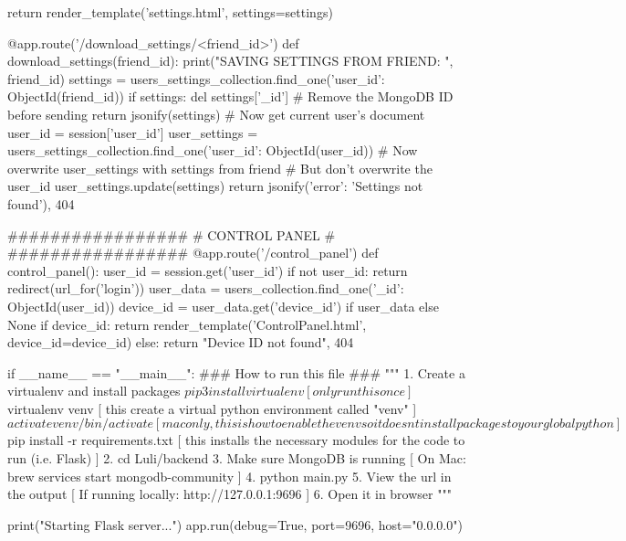 \documentclass[12pt]{article} %
\begin{document}
\begin{pythoncode}[caption={Main Flask Backend Code}]
        return render_template('settings.html', settings=settings)
    
    @app.route('/download_settings/<friend_id>')
    def download_settings(friend_id):
        print("SAVING SETTINGS FROM FRIEND: ", friend_id)
        settings = users_settings_collection.find_one({'user_id': ObjectId(friend_id)})
        if settings:
            del settings['_id']  # Remove the MongoDB ID before sending
            return jsonify(settings)
        # Now get current user's document
        user_id = session['user_id']
        user_settings = users_settings_collection.find_one({'user_id': ObjectId(user_id)})
        # Now overwrite user_settings with settings from friend
        # But don't overwrite the user_id
        user_settings.update(settings)
        return jsonify({'error': 'Settings not found'}), 404
    
    
    #################
    # CONTROL PANEL #
    #################
    @app.route('/control_panel')
    def control_panel():
        user_id = session.get('user_id')
        if not user_id:
            return redirect(url_for('login'))
        user_data = users_collection.find_one({'_id': ObjectId(user_id)})
        device_id = user_data.get('device_id') if user_data else None
        if device_id:
            return render_template('ControlPanel.html', device_id=device_id)
        else:
            return "Device ID not found", 404
    
    
    
    if __name__ == "__main__":
        ### How to run this file ###
        """
        1. Create a virtualenv and install packages
            $ pip3 install virtualenv           [ only run this once ]
            $ virtualenv venv                   [ this create a virtual python environment called "venv" ]
            $ activate venv/bin/activate        [ mac only, this is how to enable the venv so it doesnt install packages to your global python ]
            $ pip install -r requirements.txt   [ this installs the necessary modules for the code to run (i.e. Flask) ]
        2. cd Luli/backend
        3. Make sure MongoDB is running         [ On Mac: brew services start mongodb-community ]
        4. python main.py
        5. View the url in the output           [ If running locally: http://127.0.0.1:9696 ]
        6. Open it in browser
        """
    
    
        print("Starting Flask server...")
        app.run(debug=True, port=9696, host="0.0.0.0")    
\end{pythoncode}
\end{document}

